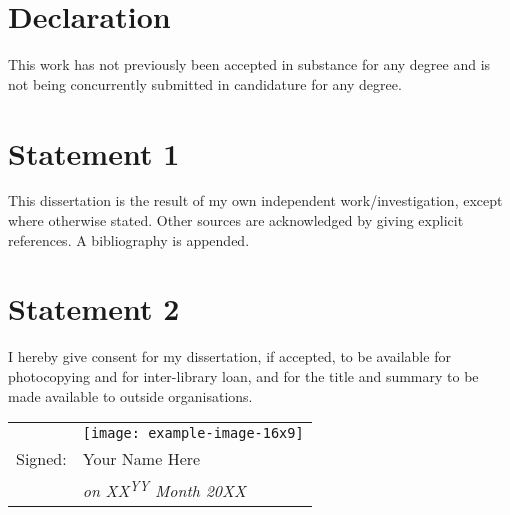 
\section*{Declaration}
This work has not previously been accepted in substance for any degree and is not being concurrently submitted in candidature for any degree.

\section*{Statement 1}
This dissertation is the result of my own independent work/investigation, except where otherwise stated. Other sources are acknowledged by giving explicit references. A bibliography is appended.

\section*{Statement 2}
I hereby give consent for my dissertation, if accepted, to be available for photocopying and for inter-library loan, and for the title and summary to be made available to outside organisations.

\vspace{1cm}


\begin{tabular}{ll}
          & \texttt{[image: example-image-16x9]} \\
  Signed: & Your Name Here                                   \\
          & \textit{on XX\textsuperscript{YY} Month 20XX}
\end{tabular}